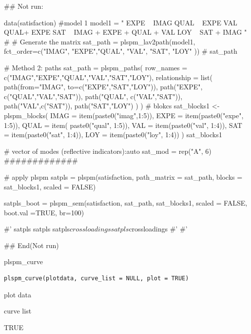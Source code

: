 \documentclass[a4paper]{book}
\begin{document}
\begin{Examples}
\begin{ExampleCode}


\#\# Not run: 

data(satisfaction)
#model 1
model1 = "
EXPE ~ IMAG
QUAL ~ EXPE
VAL ~  QUAL+ EXPE
SAT ~ IMAG + EXPE + QUAL + VAL
LOY ~ SAT + IMAG
"
# # Generate the matrix
sat_path = plspm_lav2path(model1,
                          fct_order=c("IMAG", "EXPE","QUAL", "VAL", "SAT", "LOY" ))
# sat_path

# Method 2: paths
sat_path = plspm_paths(
  row_names = c("IMAG","EXPE","QUAL","VAL","SAT","LOY"),
  relationship = list(
    path(from="IMAG", to=c("EXPE","SAT","LOY")),
    path("EXPE", c("QUAL","VAL","SAT")),
    path("QUAL", c("VAL","SAT")),
    path("VAL",c("SAT")),
    path("SAT","LOY")
  )
)
# blokcs
sat_blocks1 <- plspm_blocks(
  IMAG = item(paste0("imag",1:5)),
  EXPE = item(paste0("expe", 1:5)),
  QUAL = item( paste0("qual", 1:5)),
  VAL = item(paste0("val", 1:4)),
  SAT = item(paste0("sat", 1:4)),
  LOY = item(paste0("loy", 1:4))
)
sat_blocks1

# vector of modes (reflective indicators):auto
sat_mod = rep("A", 6)
#############

# apply plspm
satpls = plspm(satisfaction,
                   path_matrix = sat_path,
                   blocks = sat_blocks1,
                   scaled = FALSE)

satpls_boot = plspm_sem(satisfaction, sat_path, sat_blocks1, scaled = FALSE,
                        boot.val =TRUE, br=100)


#'
satpls %
satpls %
satpls$crossloadings %
satpls$crossloadings %
#'
#'

## End(Not run)

\end{ExampleCode}
\end{Examples}
%
\begin{Description}
plspm\_curve
\end{Description}
%
\begin{Usage}
\begin{verbatim}
plspm_curve(plotdata, curve_list = NULL, plot = TRUE)
\end{verbatim}
\end{Usage}
%
\begin{Arguments}
\begin{ldescription}
\item[\code{plotdata}] plot data

\item[\code{curve\_list}] curve list

\item[\code{plot}] TRUE
\end{ldescription}
\end{Arguments}
\end{document}
